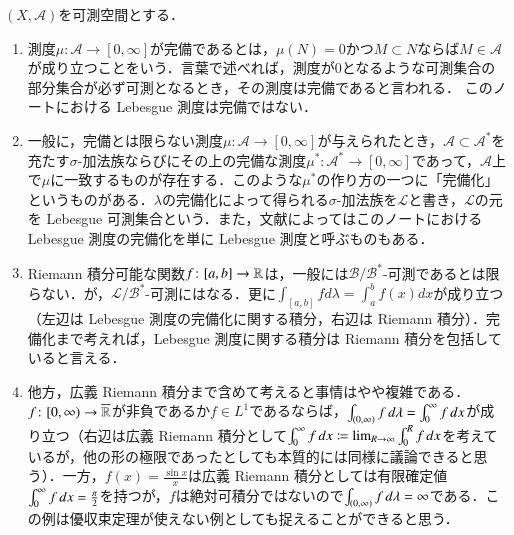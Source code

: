 \begin{que}$(X,\mathcal{A})$を可測空間とする．
\begin{enumerate}
\item 測度$\mu \colon \mathcal{A} \to [0,\infty]$が完備であるとは，$\mu(N)=0$かつ$M \subset N$ならば$M \in \mathcal{A}$が成り立つことをいう．言葉で述べれば，測度が0となるような可測集合の部分集合が必ず可測となるとき，その測度は完備であると言われる． このノートにおける Lebesgue 測度は完備ではない．
\item 一般に，完備とは限らない測度$\mu \colon \mathcal{A} \to [0,\infty]$が与えられたとき，$\mathcal{A} \subset \mathcal{A}^*$を充たす$\sigma$-加法族ならびにその上の完備な測度$\mu^* \colon \mathcal{A}^* \to [0,\infty]$であって，$\mathcal{A}$上で$\mu$に一致するものが存在する．このような$\mu^*$の作り方の一つに「完備化」というものがある．$\lambda$の完備化によって得られる$\sigma$-加法族を$\mathcal{L}$と書き，$\mathcal{L}$の元を Lebesgue 可測集合という．また，文献によってはこのノートにおける Lebesgue 測度の完備化を単に Lebesgue 測度と呼ぶものもある．
\item Riemann 積分可能な関数$f \colon [a,b] \to \mathbb{R}$は，一般には$\mathcal{B}/\mathcal{B}^*$-可測であるとは限らない．が，$\mathcal{L}/\mathcal{B}^*$-可測にはなる．更に$\int_{[a,b]} f d \lambda = \int_a^b f(x) dx$が成り立つ（左辺は Lebesgue 測度の完備化に関する積分，右辺は Riemann 積分）．完備化まで考えれば，Lebesgue 測度に関する積分は Riemann 積分を包括していると言える．
\item 他方，広義 Riemann 積分まで含めて考えると事情はやや複雑である．$f \colon [0,\infty) \to \overline{\mathbb{R}}$が非負であるか$f \in L^1$であるならば，$\int_{(0,\infty)} f \mathop{}\!d \lambda = \int_{0}^\infty f \mathop{}\!d x$が成り立つ（右辺は広義 Riemann 積分として$\int_0^\infty f \mathop{}\!d x \coloneqq \lim_{R \to \infty} \int_0^R f \mathop{}\!d x$を考えているが，他の形の極限であったとしても本質的には同様に議論できると思う）．一方，$f(x) = \frac{\sin x}{x}$は広義 Riemann 積分としては有限確定値$\int_0^\infty f \mathop{}\!d x = \frac{\pi}{2}$を持つが，$f$は絶対可積分ではないので$\int_{(0,\infty)} f \mathop{}\!d \lambda = \infty$である．この例は優収束定理が使えない例としても捉えることができると思う．
\end{enumerate}
\end{que}

